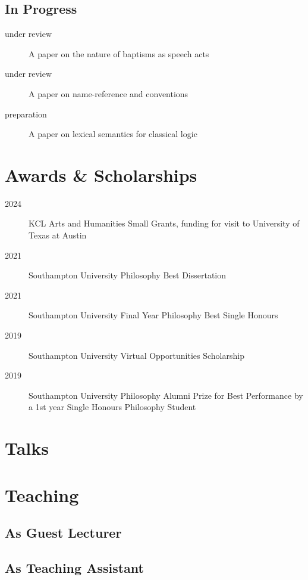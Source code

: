 \documentclass{cv}
\begin{document}
\subsection*{In Progress}
\begin{description}
\item[under review] A paper on the nature of baptisms as speech acts
\item[under review] A paper on name-reference and conventions
\item[preparation] A paper on lexical semantics for classical logic
\end{description}

\section*{Awards \& Scholarships}
\begin{description}
\item[{2024}] KCL Arts and Humanities Small Grants, funding for visit to
  University of Texas at Austin
\item[{2021}] Southampton University Philosophy Best Dissertation
\item[{2021}] Southampton University Final Year Philosophy Best Single
  Honours
\item[{2019}] Southampton University Virtual Opportunities Scholarship
\item[{2019}] Southampton University Philosophy Alumni Prize for Best
  Performance by a 1st year Single Honours Philosophy Student
\end{description}

\section*{Talks }
\printbibliography[check=Presentation]{}

\section*{Teaching}
\subsection*{As Guest Lecturer}
\printbibliography[env=teaching,check=Teaching+GuestLecturer]{}

\subsection*{As Teaching Assistant}
\printbibliography[env=teaching,check=Teaching+TA]{}
\end{document}
